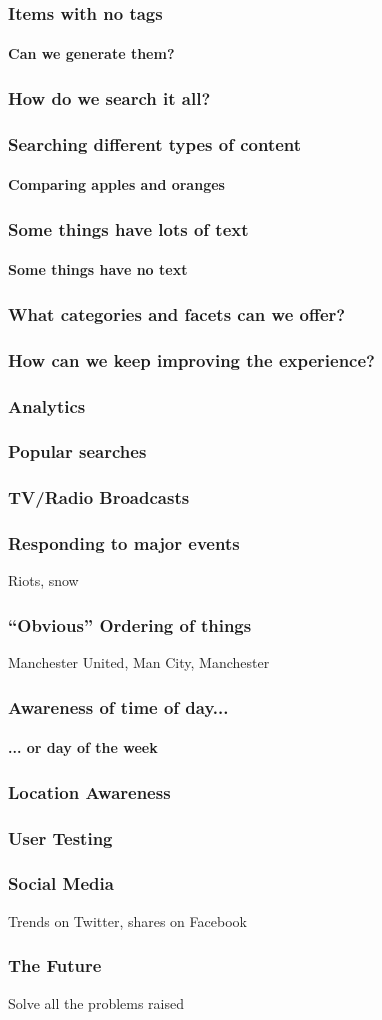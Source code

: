 \documentclass{beamer}
\begin{document}
\begin{frame}
  \frametitle{Items with no tags}
  \framesubtitle{Can we generate them?}
\end{frame}

\begin{frame}
  \frametitle{How do we search it all?}
\end{frame}

\begin{frame}
  \frametitle{Searching different types of content}
  \framesubtitle{Comparing apples and oranges}
\end{frame}

\begin{frame}
  \frametitle{Some things have lots of text}
  \framesubtitle{Some things have no text}
\end{frame}

\begin{frame}
  \frametitle{What categories and facets can we offer?}
\end{frame}

\begin{frame}
  \frametitle{How can we keep improving the experience?}
\end{frame}

\begin{frame}
  \frametitle{Analytics}
\end{frame}

\begin{frame}
  \frametitle{Popular searches}
\end{frame}

\begin{frame}
  \frametitle{TV/Radio Broadcasts}
\end{frame}

\begin{frame}
  \frametitle{Responding to major events}
  Riots, snow
\end{frame}

\begin{frame}
  \frametitle{``Obvious'' Ordering of things}
  Manchester United, Man City, Manchester
\end{frame}

\begin{frame}
  \frametitle{Awareness of time of day...}
  \framesubtitle{... or day of the week}
\end{frame}

\begin{frame}
  \frametitle{Location Awareness}
\end{frame}

\begin{frame}
  \frametitle{User Testing}
\end{frame}

\begin{frame}
  \frametitle{Social Media}
  Trends on Twitter, shares on Facebook
\end{frame}

\begin{frame}
  \frametitle{The Future}
  Solve all the problems raised
\end{frame}
\end{document}
